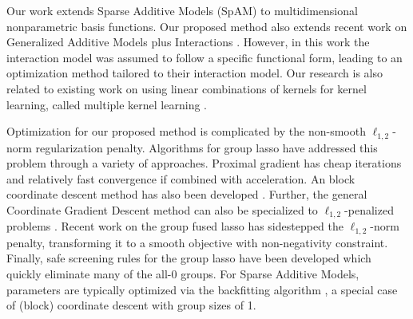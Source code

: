 Our work extends Sparse Additive Models (SpAM) \citep{ravikumar09spam} 
to multidimensional nonparametric basis functions.
Our proposed method also extends recent work on 
Generalized Additive Models plus Interactions \citep{intelligible:2013}.
However, in this work the interaction model was assumed to follow a specific functional form,
leading to an optimization method tailored to their interaction model.
Our research is also related to existing work on 
using linear combinations of kernels for kernel learning,
called multiple kernel learning \citep{mkl-review:2011}.

Optimization for our proposed method is complicated by 
the non-smooth $\ell_{1,2}$-norm regularization penalty.
Algorithms for group lasso have addressed this problem 
through a variety of approaches.
Proximal gradient \citep{beck2009fast}
has cheap iterations and relatively fast convergence if combined with acceleration.
An block coordinate descent method has also been developed \citep{bcd-group-lasso:2013}.
Further, the general Coordinate Gradient Descent method \citep{cgd:2009} 
can also be specialized to $\ell_{1,2}$-penalized problems 
\citep{meier2008group,note-group-lasso:2010}.
Recent work \citep{group-fused-lasso:2014} on the group fused lasso 
has sidestepped the $\ell_{1,2}$-norm penalty, transforming it to a 
smooth objective with non-negativity constraint.
Finally, safe screening rules for the group lasso have been developed 
\citep{group-lasso-screening:2013} which quickly eliminate many of the all-0 
groups.
For Sparse Additive Models, parameters are typically 
optimized via the backfitting algorithm \citep{ravikumar09spam}, 
a special case of (block) coordinate descent with group sizes of 1.

